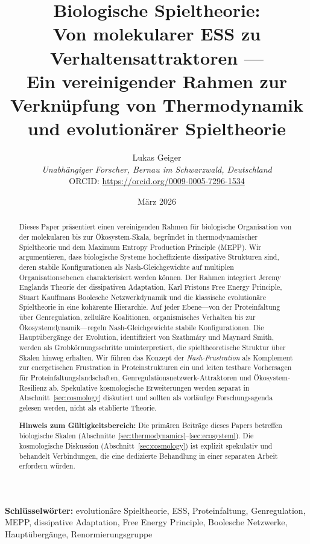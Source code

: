 \documentclass[12pt,a4paper]{article}
\title{Biologische Spieltheorie:\\
Von molekularer ESS zu Verhaltensattraktoren ---\\
Ein vereinigender Rahmen zur Verkn\"upfung von Thermodynamik und evolution\"arer Spieltheorie}
\author{Lukas Geiger\\
\textit{Unabh\"angiger Forscher, Bernau im Schwarzwald, Deutschland}\\
ORCID: \url{https://orcid.org/0009-0005-7296-1534}}
\date{M\"arz 2026}
\theoremstyle{remark}
\begin{document}
\maketitle

\begin{abstract}
Dieses Paper pr\"asentiert einen vereinigenden Rahmen f\"ur biologische Organisation von der molekularen bis zur \"Okosystem-Skala, begr\"undet in thermodynamischer Spieltheorie und dem Maximum Entropy Production Principle (MEPP). Wir argumentieren, dass biologische Systeme hocheffiziente dissipative Strukturen sind, deren stabile Konfigurationen als Nash-Gleichgewichte auf multiplen Organisationsebenen charakterisiert werden k\"onnen. Der Rahmen integriert Jeremy Englands Theorie der dissipativen Adaptation, Karl Fristons Free Energy Principle, Stuart Kauffmans Boolesche Netzwerkdynamik und die klassische evolution\"are Spieltheorie in eine koh\"arente Hierarchie. Auf jeder Ebene---von der Proteinfaltung \"uber Genregulation, zellul\"are Koalitionen, organismisches Verhalten bis zur \"Okosystemdynamik---regeln Nash-Gleichgewichte stabile Konfigurationen. Die Haupt\"uberg\"ange der Evolution, identifiziert von Szathm\'ary und Maynard Smith, werden als Grobk\"ornungsschritte uminterpretiert, die spieltheoretische Struktur \"uber Skalen hinweg erhalten. Wir f\"uhren das Konzept der \emph{Nash-Frustration} als Komplement zur energetischen Frustration in Proteinstrukturen ein und leiten testbare Vorhersagen f\"ur Proteinfaltungslandschaften, Genregulationsnetzwerk-Attraktoren und \"Okosystem-Resilienz ab. Spekulative kosmologische Erweiterungen werden separat in Abschnitt~\ref{sec:cosmology} diskutiert und sollten als vorl\"aufige Forschungsagenda gelesen werden, nicht als etablierte Theorie.

\textbf{Hinweis zum G\"ultigkeitsbereich:} Die prim\"aren Beitr\"age dieses Papers betreffen biologische Skalen (Abschnitte~\ref{sec:thermodynamics}--\ref{sec:ecosystem}). Die kosmologische Diskussion (Abschnitt~\ref{sec:cosmology}) ist explizit spekulativ und behandelt Verbindungen, die eine dedizierte Behandlung in einer separaten Arbeit erfordern w\"urden.
\end{abstract}

\textbf{Schl\"usselw\"orter:} evolution\"are Spieltheorie, ESS, Proteinfaltung, Genregulation, MEPP, dissipative Adaptation, Free Energy Principle, Boolesche Netzwerke, Haupt\"uberg\"ange, Renormierungsgruppe

\end{document}
